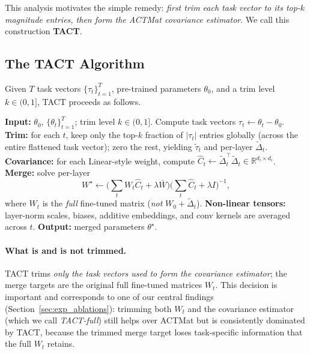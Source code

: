 \documentclass{article}
\theoremstyle{plain}
\theoremstyle{definition}
\theoremstyle{remark}
\begin{document}
This analysis motivates the simple remedy: \emph{first trim each task vector to its top-$k$ magnitude entries, then form the ACTMat covariance estimator}. We call this construction \textbf{TACT}.

\subsection{The TACT Algorithm}

Given $T$ task vectors $\{\tau_t\}_{t=1}^T$, pre-trained parameters $\theta_0$, and a trim level $k \in (0, 1]$, TACT proceeds as follows.

\begin{algorithm}[t]
\caption{TACT: Trimmed-task-vector Activation Covariance Transform}
\label{alg:tact}
\begin{algorithmic}[1]
\STATE \textbf{Input:} $\theta_0$, $\{\theta_t\}_{t=1}^T$; trim level $k \in (0,1]$.
\STATE Compute task vectors $\tau_t \gets \theta_t - \theta_0$.
\STATE \textbf{Trim:} for each $t$, keep only the top-$k$ fraction of $|\tau_t|$ entries globally (across the entire flattened task vector); zero the rest, yielding $\tilde{\tau}_t$ and per-layer $\tilde{\Delta}_t$.
\STATE \textbf{Covariance:} for each Linear-style weight, compute $\hat{C}_t \gets \tilde{\Delta}_t^\top \tilde{\Delta}_t \in \mathbb{R}^{d_i \times d_i}$.
\STATE \textbf{Merge:} solve per-layer
\[\textstyle W^\star \gets \Big(\sum_t W_t \hat{C}_t + \lambda \bar W\Big)\Big(\sum_t \hat{C}_t + \lambda I\Big)^{-1},\]
where $W_t$ is the \emph{full} fine-tuned matrix (\emph{not} $W_0 + \tilde{\Delta}_t$).
\STATE \textbf{Non-linear tensors:} layer-norm scales, biases, additive embeddings, and conv kernels are averaged across $t$.
\STATE \textbf{Output:} merged parameters $\theta^\star$.
\end{algorithmic}
\end{algorithm}

\paragraph{What is and is not trimmed.} TACT trims \emph{only the task vectors used to form the covariance estimator}; the merge targets are the original full fine-tuned matrices $W_t$. This decision is important and corresponds to one of our central findings (Section~\ref{sec:exp_ablations}): trimming both $W_t$ and the covariance estimator (which we call \emph{TACT-full}) still helps over ACTMat but is consistently dominated by TACT, because the trimmed merge target loses task-specific information that the full $W_t$ retains.
\end{document}
